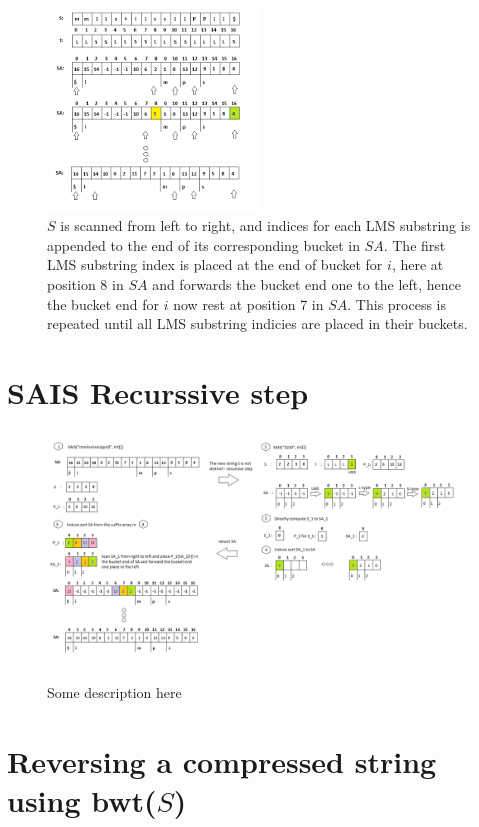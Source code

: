 \documentclass[12pt]{article} %
\begin{document}
\begin{figure}[H]
    \centering
    \includegraphics[width=0.5\textwidth]{SAIS_LMS3}
    \captionsetup{width=0.8\textwidth}
    \caption{$S$ is scanned from left to right, and indices for each LMS substring is appended to the end of its corresponding bucket in $SA$. The first LMS substring index is placed at the end of bucket for $i$, here at position 8 in $SA$ and forwards the bucket end one to the left, hence the bucket end for $i$ now rest at position 7 in $SA$. This process is repeated until all LMS substring indicies are placed in their buckets.}
    \label{fig:SAIS_LMS3}
\end{figure}

\newpage
\section{SAIS Recurssive step}\label{SAIS Algorithm run}
\begin{figure}[H]
    \centering
    \includegraphics[width=1.1\textwidth]{SAIS_RECURSIVEDESCRIPTION}
    \captionsetup{width=0.8\textwidth}
    \caption{Some description here}
    \label{fig:SAIS_RECURSIVEDESCRIPTION}
\end{figure}
\newpage
\section{Reversing a compressed string using bwt($S$)}\label{BWT}
\newpage
\nocite{*}



\end{document}

